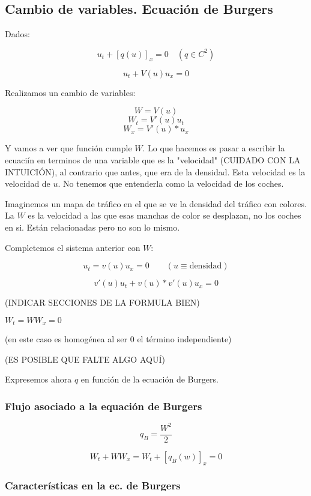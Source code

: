 	\subsection{Cambio de variables. Ecuación de Burgers}

		Dados:

		$$ u_t + [q(u)]_x = 0 \quad (q \in C^2) $$

		$$u_t + V(u)u_x = 0 $$

		Realizamos un cambio de variables:

		$$W = V(u)$$
		$$W_t = V'(u) u_t$$
		$$W_x = V'(u) * u_x$$

		Y vamos a ver que función cumple $W$. Lo que hacemos es pasar a escribir la ecuaciín en terminos de una variable que es la "velocidad" (CUIDADO CON LA INTUICIÓN), al contrario que antes, que era de la densidad. Esta velocidad es la velocidad de $u$. No tenemos que entenderla como la velocidad de los coches.

		Imaginemos un mapa de tráfico en el que se ve la densidad del tráfico con colores. La $W$ es la velocidad a las que esas manchas de color se desplazan, no los coches en si. Están relacionadas pero no son lo mismo.

		Completemos el sistema anterior con $W$:

		$$u_t = v(u) u_x = 0\quad\quad (u \equiv \text{densidad})$$

		$$v'(u) u_t + v(u) * v'(u) u_x = 0$$

		(INDICAR SECCIONES DE LA FORMULA BIEN)

		\( W_t = WW_x = 0 \label{eq:Ecuación de Burgers} \)

		(en este caso es homogénea al ser $0$ el término independiente)

		(ES POSIBLE QUE FALTE ALGO AQUÍ)


		Expresemos ahora $q$ en función de la ecuación de Burgers.

		\subsubsection{Flujo asociado a la equación de Burgers}

			$$q_{B} = \frac{W^2}{2}$$

			$$W_t + WW_x = W_t + [q_B(w)]_x = 0$$


		\subsubsection{Características en la ec. de Burgers}

